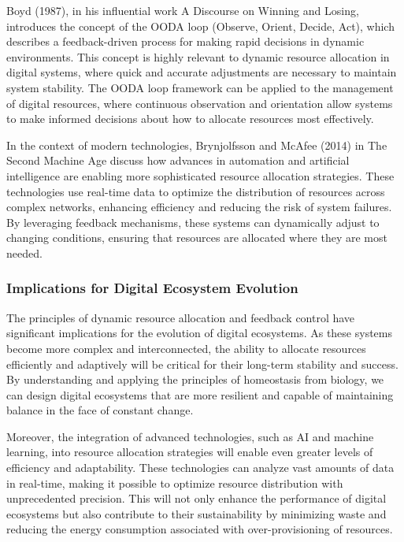 \documentclass[12pt,twoside]{article}
\begin{document}
Boyd (1987), in his influential work A Discourse on Winning and Losing, introduces the concept of the OODA loop (Observe, Orient, Decide, Act), which describes a feedback-driven process for making rapid decisions in dynamic environments. This concept is highly relevant to dynamic resource allocation in digital systems, where quick and accurate adjustments are necessary to maintain system stability. The OODA loop framework can be applied to the management of digital resources, where continuous observation and orientation allow systems to make informed decisions about how to allocate resources most effectively.

In the context of modern technologies, Brynjolfsson and McAfee (2014) in The Second Machine Age discuss how advances in automation and artificial intelligence are enabling more sophisticated resource allocation strategies. These technologies use real-time data to optimize the distribution of resources across complex networks, enhancing efficiency and reducing the risk of system failures. By leveraging feedback mechanisms, these systems can dynamically adjust to changing conditions, ensuring that resources are allocated where they are most needed.

\subsubsection{Implications for Digital Ecosystem Evolution}

The principles of dynamic resource allocation and feedback control have significant implications for the evolution of digital ecosystems. As these systems become more complex and interconnected, the ability to allocate resources efficiently and adaptively will be critical for their long-term stability and success. By understanding and applying the principles of homeostasis from biology, we can design digital ecosystems that are more resilient and capable of maintaining balance in the face of constant change.

Moreover, the integration of advanced technologies, such as AI and machine learning, into resource allocation strategies will enable even greater levels of efficiency and adaptability. These technologies can analyze vast amounts of data in real-time, making it possible to optimize resource distribution with unprecedented precision. This will not only enhance the performance of digital ecosystems but also contribute to their sustainability by minimizing waste and reducing the energy consumption associated with over-provisioning of resources.
\end{document}
